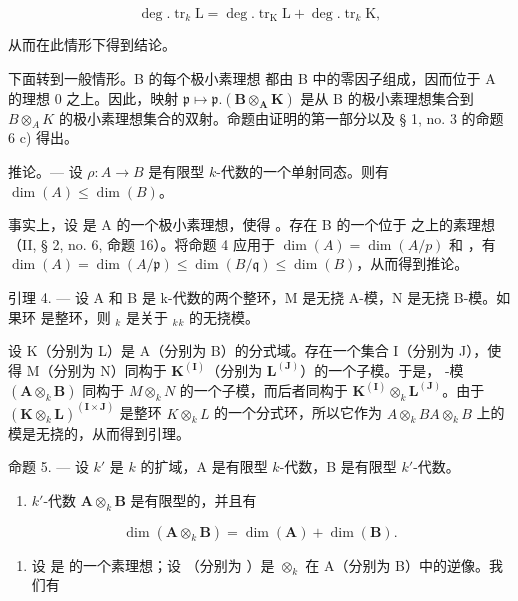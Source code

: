 \[
\deg . \operatorname{tr} _ {k} \mathrm{L} = \deg . \operatorname{tr} _ {\mathrm{K}} \mathrm{L} + \deg . \operatorname{tr} _ {k} \mathrm{K},
\]

从而在此情形下得到结论。

下面转到一般情形。B 的每个极小素理想  都由 B 中的零因子组成，因而位于 A 的理想 0 之上。因此，映射 \(\mathfrak{p} \mapsto \mathfrak{p}.(\mathbf{B} \otimes_{\mathbf{A}} \mathbf{K})\) 是从 B 的极小素理想集合到 \(B \otimes_{A} K\) 的极小素理想集合的双射。命题由证明的第一部分以及 § 1, no. 3 的命题 6 c) 得出。

推论。--- 设 \(\rho: A \to B\) 是有限型 \(k\)-代数的一个单射同态。则有 \(\dim(A) \leqslant \dim(B)\)。

事实上，设  是 A 的一个极小素理想，使得  。存在 B 的一个位于  之上的素理想  （II, § 2, no. 6, 命题 16）。将命题 4 应用于 \(\dim(A) = \dim(A/p)\) 和  ，有 \(\dim(A) = \dim(A/\mathfrak{p}) \leqslant \dim(B/\mathfrak{q}) \leqslant \dim(B)\)，从而得到推论。

引理 4. --- 设 A 和 B 是 k-代数的两个整环，M 是无挠 A-模，N 是无挠 B-模。如果环  是整环，则 \(_{k}\) 是关于 \(_{k}\)\(_{k}\) 的无挠模。

设 K（分别为 L）是 A（分别为 B）的分式域。存在一个集合 I（分别为 J），使得 M（分别为 N）同构于 \(\mathbf{K}^{(\mathbf{I})}\)（分别为 \(\mathbf{L}^{(\mathbf{J})}\)）的一个子模。于是， -模 \((\mathbf{A} \otimes_k \mathbf{B})\) 同构于 \(M \otimes_k N\) 的一个子模，而后者同构于 \(\mathbf{K}^{(\mathbf{I})} \otimes_k \mathbf{L}^{(\mathbf{J})}\)。由于 \((\mathbf{K} \otimes_k \mathbf{L})^{(\mathbf{I} \times \mathbf{J})}\) 是整环 \(K \otimes_k L\) 的一个分式环，所以它作为 \(A \otimes_k B\)\(A \otimes_k B\) 上的模是无挠的，从而得到引理。

命题 5. --- 设 \(k'\) 是 \(k\) 的扩域，A 是有限型 \(k\)-代数，B 是有限型 \(k'\)-代数。

\begin{enumerate}
\def\labelenumi{\alph{enumi})}
\tightlist
\item
  \(k'\)-代数 \(\mathbf{A} \otimes_k \mathbf{B}\) 是有限型的，并且有
\end{enumerate}

\[
\dim (\mathbf {A} \otimes_ {k} \mathbf {B}) = \dim (\mathbf {A}) + \dim (\mathbf {B}).
\]

\begin{enumerate}
\def\labelenumi{\alph{enumi})}
\setcounter{enumi}{1}
\tightlist
\item
  设  是  的一个素理想；设  （分别为  ）是 \(\otimes_{k}\) 在 A（分别为 B）中的逆像。我们有
\end{enumerate}

